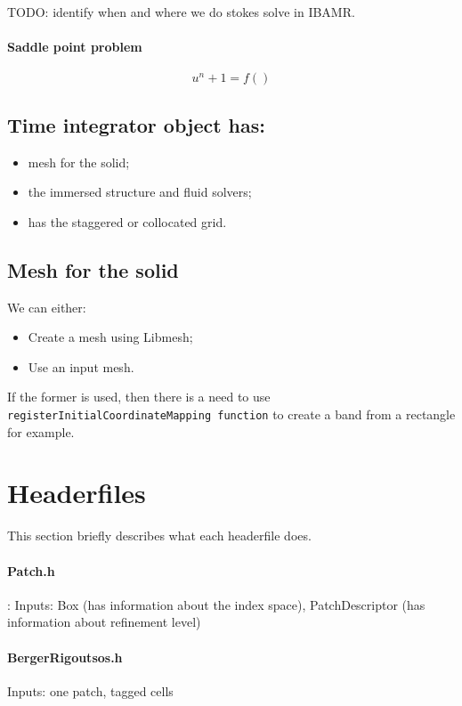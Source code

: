 \documentclass[12pt,a4paper,twoside]{article}
\begin{document}
{\color{red} TODO: identify when and where we do stokes solve in IBAMR.
}
\paragraph{Saddle point problem}
\begin{equation}
    [A B^T \\ B 0 ]u^n+1 = f ()
\end{equation}

 

\subsection{Time integrator object has:}
\begin{itemize}
    \item mesh for the solid;
    \item the immersed structure and fluid solvers;
    \item has the staggered or collocated grid.
\end{itemize}




\subsection{Mesh for the solid}
We can either:
\begin{itemize}
    \item Create a mesh using Libmesh;
    \item Use an input mesh.
\end{itemize}
If the former is used, then there is a need to use \texttt{registerInitialCoordinateMapping function} to create a band from a rectangle for example. 

\section{Headerfiles}
This section briefly describes what each headerfile does. 
\paragraph{Patch.h}: Inputs: Box (has information about the index space), PatchDescriptor (has information about refinement level) 

\paragraph{BergerRigoutsos.h}
Inputs: one patch, tagged cells
\end{document}
